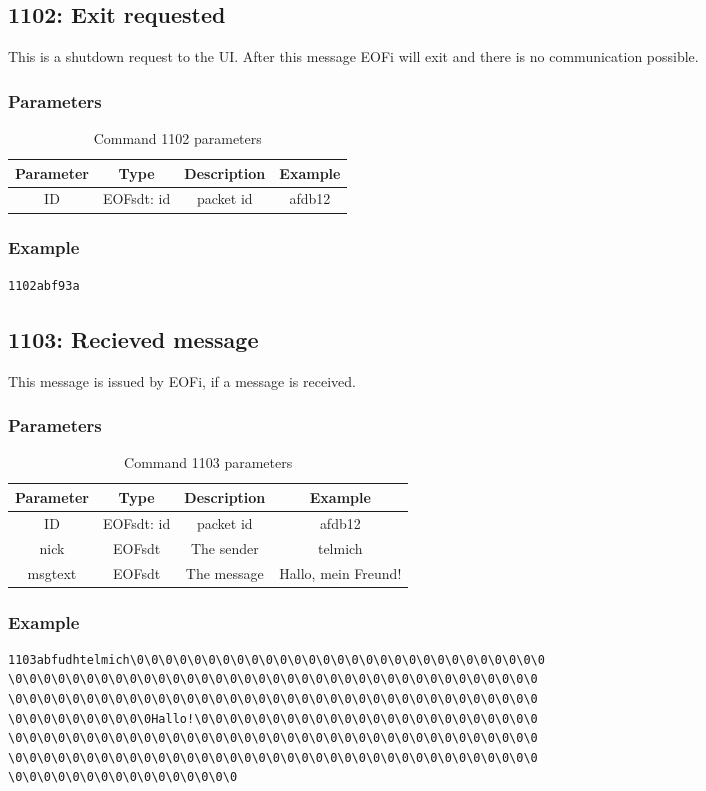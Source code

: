 \documentclass[12pt,a4paper]{book}
\begin{document}
\subsection{1102: Exit requested}
This is a  shutdown request to the UI.
After this message EOFi will exit and there is no communication possible.
\subsubsection{Parameters}
\begin{longtable}{|c|c|c|c|}
\caption{Command 1102 parameters}\\
\hline
\textbf{Parameter} & \textbf{Type} & \textbf{Description} & \textbf{Example}\\
\hline
ID & EOFsdt: id & packet id & afdb12\\
\hline
\end{longtable}
\subsubsection{Example}
\begin{verbatim}
1102abf93a
\end{verbatim}
\subsection{1103: Recieved message}
This message is issued by EOFi, if a message is received.
\subsubsection{Parameters}
\begin{longtable}{|c|c|c|c|}
\caption{Command 1103 parameters}\\
\hline
\textbf{Parameter} & \textbf{Type} & \textbf{Description} & \textbf{Example}\\
\hline
ID & EOFsdt: id & packet id & afdb12\\
\hline
nick & EOFsdt & The sender & telmich\\
\hline
msgtext & EOFsdt & The message & Hallo, mein Freund!\\
\hline
\end{longtable}
\subsubsection{Example}
\begin{verbatim}
1103abfudhtelmich\0\0\0\0\0\0\0\0\0\0\0\0\0\0\0\0\0\0\0\0\0\0\0\0\0\0\0\0\0
\0\0\0\0\0\0\0\0\0\0\0\0\0\0\0\0\0\0\0\0\0\0\0\0\0\0\0\0\0\0\0\0\0\0\0\0\0
\0\0\0\0\0\0\0\0\0\0\0\0\0\0\0\0\0\0\0\0\0\0\0\0\0\0\0\0\0\0\0\0\0\0\0\0\0
\0\0\0\0\0\0\0\0\0\0Hallo!\0\0\0\0\0\0\0\0\0\0\0\0\0\0\0\0\0\0\0\0\0\0\0\0
\0\0\0\0\0\0\0\0\0\0\0\0\0\0\0\0\0\0\0\0\0\0\0\0\0\0\0\0\0\0\0\0\0\0\0\0\0
\0\0\0\0\0\0\0\0\0\0\0\0\0\0\0\0\0\0\0\0\0\0\0\0\0\0\0\0\0\0\0\0\0\0\0\0\0
\0\0\0\0\0\0\0\0\0\0\0\0\0\0\0\0
\end{verbatim}
\end{document}
